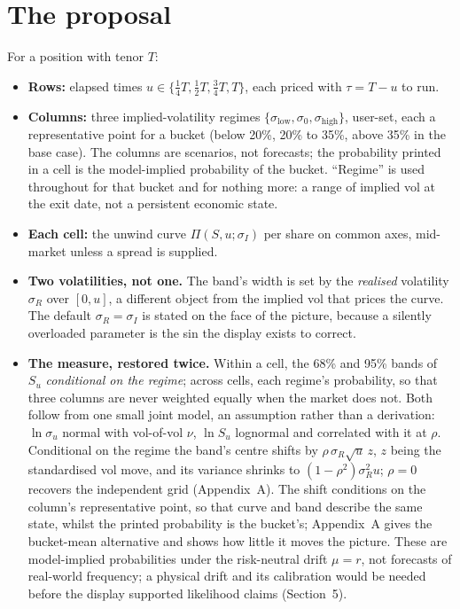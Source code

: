 \documentclass[11pt,a4paper]{article}
\begin{document}
\section{The proposal}

\noindent For a position with tenor $T$:

\begin{itemize}[leftmargin=1.4em,itemsep=3pt,topsep=6pt]
\item \textbf{Rows:} elapsed times $u \in \{\tfrac14 T, \tfrac12 T, \tfrac34 T, T\}$, each priced with $\tau = T - u$ to run.
\item \textbf{Columns:} three implied-volatility regimes $\{\sigma_{\text{low}}, \sigma_0, \sigma_{\text{high}}\}$, user-set, each a representative point for a bucket (below 20\%, 20\% to 35\%, above 35\% in the base case). The columns are scenarios, not forecasts; the probability printed in a cell is the model-implied probability of the bucket. ``Regime'' is used throughout for that bucket and for nothing more: a range of implied vol at the exit date, not a persistent economic state.
\item \textbf{Each cell:} the unwind curve $\Pi(S,u;\sigma_I)$ per share on common axes, mid-market unless a spread is supplied.
\item \textbf{Two volatilities, not one.} The band's width is set by the \emph{realised} volatility $\sigma_R$ over $[0,u]$, a different object from the implied vol that prices the curve. The default $\sigma_R = \sigma_I$ is stated on the face of the picture, because a silently overloaded parameter is the sin the display exists to correct.
\item \textbf{The measure, restored twice.} Within a cell, the 68\% and 95\% bands of $S_u$ \emph{conditional on the regime}; across cells, each regime's probability, so that three columns are never weighted equally when the market does not. Both follow from one small joint model, an assumption rather than a derivation: $\ln\sigma_u$ normal with vol-of-vol $\nu$, $\ln S_u$ lognormal and correlated with it at $\rho$. Conditional on the regime the band's centre shifts by $\rho\,\sigma_R\sqrt{u}\,z$, $z$ being the standardised vol move, and its variance shrinks to $(1-\rho^2)\sigma_R^2 u$; $\rho = 0$ recovers the independent grid (Appendix~A). The shift conditions on the column's representative point, so that curve and band describe the same state, whilst the printed probability is the bucket's; Appendix~A gives the bucket-mean alternative and shows how little it moves the picture. These are model-implied probabilities under the risk-neutral drift $\mu = r$, not forecasts of real-world frequency; a physical drift and its calibration would be needed before the display supported likelihood claims (Section~5).

\end{itemize}
\end{document}
